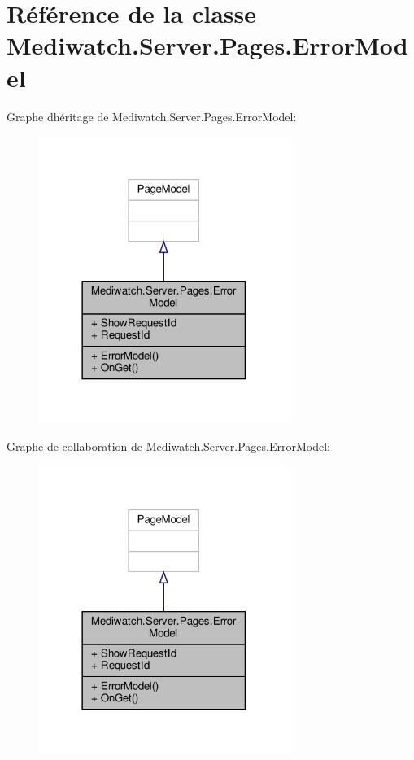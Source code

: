 \hypertarget{class_mediwatch_1_1_server_1_1_pages_1_1_error_model}{}\section{Référence de la classe Mediwatch.\+Server.\+Pages.\+Error\+Model}
\label{class_mediwatch_1_1_server_1_1_pages_1_1_error_model}


Graphe d\textquotesingle{}héritage de Mediwatch.\+Server.\+Pages.\+Error\+Model\+:
\nopagebreak
\begin{figure}[H]
\begin{center}
\leavevmode
\includegraphics[width=230pt]{class_mediwatch_1_1_server_1_1_pages_1_1_error_model__inherit__graph}
\end{center}
\end{figure}


Graphe de collaboration de Mediwatch.\+Server.\+Pages.\+Error\+Model\+:
\nopagebreak
\begin{figure}[H]
\begin{center}
\leavevmode
\includegraphics[width=230pt]{class_mediwatch_1_1_server_1_1_pages_1_1_error_model__coll__graph}
\end{center}
\end{figure}
